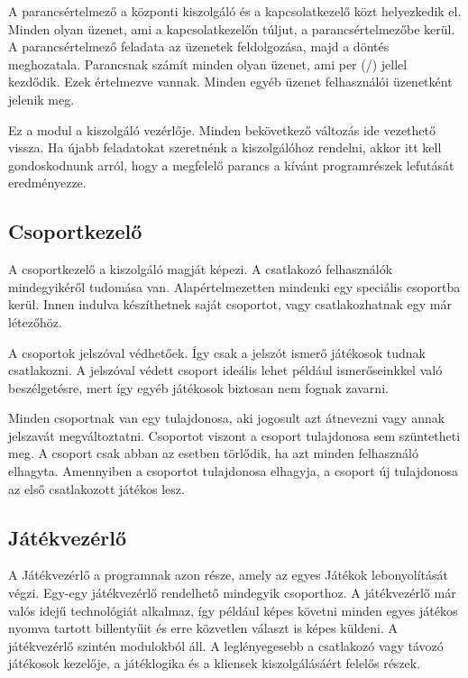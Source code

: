 \documentclass[]{article}
\begin{document}
A parancsértelmező a központi kiszolgáló és a kapcsolatkezelő közt
helyezkedik el. Minden olyan üzenet, ami a kapcsolatkezelőn túljut, a
parancsértelmezőbe kerül. A parancsértelmező feladata az üzenetek
feldolgozása, majd a döntés meghozatala. Parancsnak számít minden olyan
üzenet, ami per (/) jellel kezdődik. Ezek értelmezve vannak. Minden
egyéb üzenet felhasználói üzenetként jelenik meg.

Ez a modul a kiszolgáló vezérlője. Minden bekövetkező változás ide
vezethető vissza. Ha újabb feladatokat szeretnénk a kiszolgálóhoz
rendelni, akkor itt kell gondoskodnunk arról, hogy a megfelelő parancs a
kívánt programrészek lefutását eredményezze.


\subsection{Csoportkezelő}

A csoportkezelő a kiszolgáló magját képezi. A csatlakozó felhasználók
mindegyikéről tudomása van. Alapértelmezetten mindenki egy speciális
csoportba kerül. Innen indulva készíthetnek saját csoportot, vagy
csatlakozhatnak egy már létezőhöz.

A csoportok jelszóval védhetőek. Így csak a jelszót ismerő játékosok
tudnak csatlakozni. A jelszóval védett csoport ideális lehet például
ismerőseinkkel való beszélgetésre, mert így egyéb játékosok biztosan nem
fognak zavarni.

Minden csoportnak van egy tulajdonosa, aki jogosult azt átnevezni vagy
annak jelszavát megváltoztatni. Csoportot viszont a csoport tulajdonosa
sem szüntetheti meg. A csoport csak abban az esetben törlődik, ha azt
minden felhasználó elhagyta. Amennyiben a csoportot tulajdonosa
elhagyja, a csoport új tulajdonosa az első csatlakozott játékos lesz.


\subsection{Játékvezérlő}

A Játékvezérlő a programnak azon része, amely az egyes Játékok
lebonyolítását végzi. Egy-egy játékvezérlő rendelhető mindegyik
csoporthoz. A játékvezérlő már valós idejű technológiát alkalmaz, így
például képes követni minden egyes játékos nyomva tartott billentyűit és
erre közvetlen választ is képes küldeni. A játékvezérlő szintén
modulokból áll. A leglényegesebb a csatlakozó vagy távozó játékosok
kezelője, a játéklogika és a kliensek kiszolgálásáért felelős részek.
\end{document}
